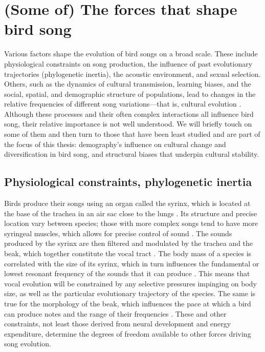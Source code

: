 \section{(Some of) The forces that shape bird song}
Various factors shape the evolution of bird songs on a broad scale. These include physiological constraints on song production, the influence of past evolutionary trajectories (phylogenetic inertia), the acoustic environment, and sexual selection. Others, such as the dynamics of cultural transmission, learning biases, and the social, spatial, and demographic structure of populations, lead to changes in the relative frequencies of different song variations---that is, cultural evolution \autocite{whiten2019}. Although these processes and their often complex interactions all influence bird song, their relative importance is not well understood. We will briefly touch on some of them and then turn to those that have been least studied and are part of the focus of this thesis: demography's influence on cultural change and diversification in bird song, and structural biases that underpin cultural stability.

\subsection{Physiological constraints, phylogenetic inertia}
Birds produce their songs using an organ called the syrinx, which is located at the base of the trachea in an air sac close to the lungs \autocite{larsen2002a}. Its structure and precise location vary between species; those with more complex songs tend to have more syringeal muscles, which allows for precise control of sound \autocite{suthers2004}. The sounds produced by the syrinx are then filtered and modulated by the trachea and the beak, which together constitute the vocal tract \autocite{podos2004}. The body mass of a species is correlated with the size of its syrinx, which in turn influences the fundamental or lowest resonant frequency of the sounds that it can produce \autocite{martin2011,ryan1985a}. This means that vocal evolution will be constrained by any selective pressures impinging on body size, as well as the particular evolutionary trajectory of the species. The same is true for the morphology of the beak, which influences the pace at which a bird can produce notes and the range of their frequencies \autocite{derryberry2012,derryberry2018,podos2001,seddon2005}. These and other constraints, not least those derived from neural development and energy expenditure, determine the degrees of freedom available to other forces driving song evolution. 

